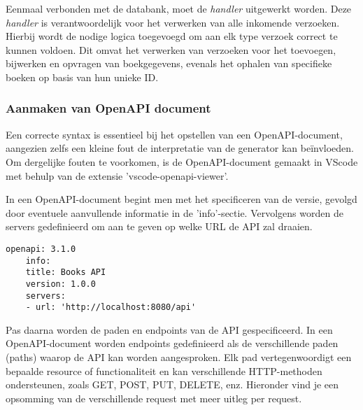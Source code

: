 Eenmaal verbonden met de databank, moet de \textit{handler} uitgewerkt worden. Deze \textit{handler} is verantwoordelijk voor het verwerken van alle inkomende verzoeken. Hierbij wordt de nodige logica toegevoegd om aan elk type verzoek correct te kunnen voldoen. Dit omvat het verwerken van verzoeken voor het toevoegen, bijwerken en opvragen van boekgegevens, evenals het ophalen van specifieke boeken op basis van hun unieke ID.


\subsubsection{Aanmaken van OpenAPI document}

Een correcte syntax is essentieel bij het opstellen van een OpenAPI-document, aangezien zelfs een kleine fout de interpretatie van de generator kan beïnvloeden. Om dergelijke fouten te voorkomen, is de OpenAPI-document gemaakt in VScode met behulp van de extensie 'vscode-openapi-viewer'. 

In een OpenAPI-document begint men met het specificeren van de versie, gevolgd door eventuele aanvullende informatie in de 'info'-sectie. Vervolgens worden de servers gedefinieerd om aan te geven op welke URL de API zal draaien.  
\begin{lstlisting}[caption=openapi.yml file]
    openapi: 3.1.0
    info:
    title: Books API
    version: 1.0.0
    servers:
    - url: 'http://localhost:8080/api'
\end{lstlisting}

Pas daarna worden de paden en endpoints van de API gespecificeerd. In een OpenAPI-document worden endpoints gedefinieerd als de verschillende paden (paths) waarop de API kan worden aangesproken. Elk pad vertegenwoordigt een bepaalde resource of functionaliteit en kan verschillende HTTP-methoden ondersteunen, zoals GET, POST, PUT, DELETE, enz. Hieronder vind je een opsomming van de verschillende request met meer uitleg per request.

